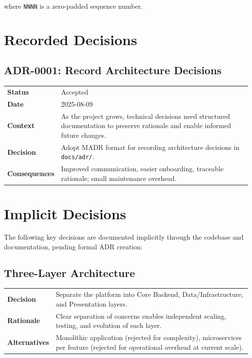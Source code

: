 where \texttt{NNNN} is a zero-padded sequence number.

\section{Recorded Decisions}
\label{app:adr:decisions}

\subsection{ADR-0001: Record Architecture Decisions}

\begin{table}[ht]
\centering
\small
\begin{tabularx}{\textwidth}{lX}
    \hline
    \textbf{Status} & Accepted \\
    \textbf{Date} & 2025-08-09 \\
    \textbf{Context} & As the project grows, technical decisions need structured documentation to preserve rationale and enable informed future changes. \\
    \textbf{Decision} & Adopt MADR format for recording architecture decisions in \texttt{docs/adr/}. \\
    \textbf{Consequences} & Improved communication, easier onboarding, traceable rationale; small maintenance overhead. \\
    \hline
\end{tabularx}
\end{table}

\section{Implicit Decisions}
\label{app:adr:implicit}

The following key decisions are documented implicitly through the codebase and documentation, pending formal ADR creation:

\subsection{Three-Layer Architecture}

\begin{table}[ht]
\centering
\small
\begin{tabularx}{\textwidth}{lX}
    \hline
    \textbf{Decision} & Separate the platform into Core Backend, Data/Infrastructure, and Presentation layers. \\
    \textbf{Rationale} & Clear separation of concerns enables independent scaling, testing, and evolution of each layer. \\
    \textbf{Alternatives} & Monolithic application (rejected for complexity), microservices per feature (rejected for operational overhead at current scale). \\
    \hline
\end{tabularx}
\end{table}

